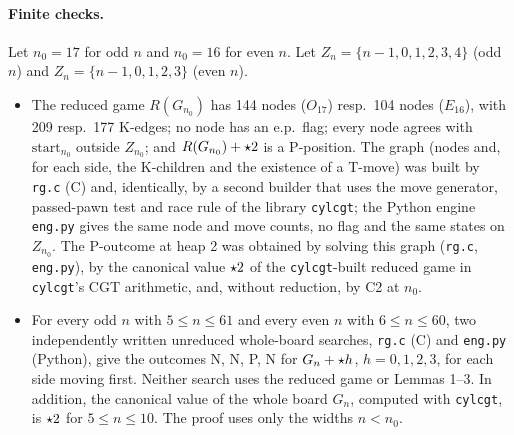 \begin{wallproof}
\paragraph{Finite checks.} Let $n_0=17$ for odd $n$ and $n_0=16$ for even $n$. Let $Z_n=\{n-1,0,1,2,3,4\}$ (odd $n$) and
$Z_n=\{n-1,0,1,2,3\}$ (even $n$).
\begin{itemize}
\item[\textbf{C1}]  The reduced game $R(G_{n_0})$ has 144 nodes ($O_{17}$) resp.\ 104 nodes ($E_{16}$), with 209 resp.\ 177
K-edges; no node has an e.p.\ flag; every node agrees with $\mathrm{start}_{n_0}$ outside $Z_{n_0}$; and $R(G_{n_0})+\mathord{\star2}$ is a
P-position. The graph (nodes and, for each side, the K-children and the existence of a T-move) was built by \texttt{rg.c} (C) and,
identically, by a second builder that uses the move generator, passed-pawn test and race rule of the library \texttt{cylcgt}; the
Python engine \texttt{eng.py} gives the same node and move counts, no flag and the same states on $Z_{n_0}$. The P-outcome at heap 2 was
obtained by solving this graph (\texttt{rg.c}, \texttt{eng.py}), by the canonical value $\mathord{\star2}$ of the \texttt{cylcgt}-built reduced game
in \texttt{cylcgt}'s CGT arithmetic, and, without reduction, by C2 at $n_0$.
\item[\textbf{C2}]  For every odd $n$ with $5\le n\le61$ and every even $n$ with $6\le n\le60$, two independently written
unreduced whole-board searches, \texttt{rg.c} (C) and \texttt{eng.py} (Python), give the outcomes N, N, P, N for $G_n+\mathord{\star h}$,
$h=0,1,2,3$, for each side moving first. Neither search uses the reduced game or Lemmas 1--3. In addition, the canonical value of the whole
board $G_n$, computed with \texttt{cylcgt}, is $\mathord{\star2}$ for $5\le n\le10$. The proof uses only the widths $n<n_0$.
\end{itemize}


\end{wallproof}
